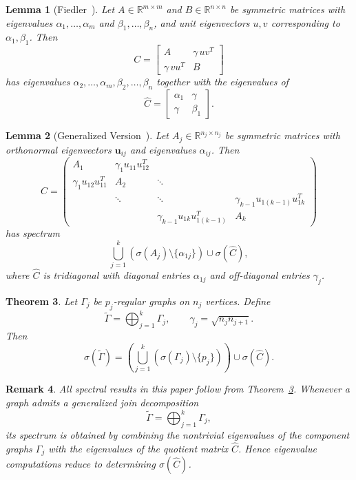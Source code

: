 \documentclass[11pt]{amsart}
\newtheorem{thm}{\bf Theorem}[section]
\newtheorem{lem}[thm]{\bf Lemma}
\newtheorem{rem}[thm]{\bf Remark}
\begin{document}
\begin{lem}[Fiedler~\cite{Fiedler1974}]
Let $A\in\mathbb{R}^{m\times m}$ and $B\in\mathbb{R}^{n\times n}$ be symmetric matrices with eigenvalues $\alpha_1,\ldots,\alpha_m$ and $\beta_1,\ldots,\beta_n$, and unit eigenvectors $u,v$ corresponding to $\alpha_1,\beta_1$. Then
\[
C=
\begin{bmatrix}
A & \gamma\,uv^T\\
\gamma\,vu^T & B
\end{bmatrix}
\]
has eigenvalues $\alpha_2,\ldots,\alpha_m, \beta_2,\ldots,\beta_n$ together with the eigenvalues of
\[
\widehat C=
\begin{bmatrix}
\alpha_1 & \gamma\\
\gamma & \beta_1
\end{bmatrix}.
\]
\end{lem}

\begin{lem}[Generalized Version~\cite{Cardoso2011}]
Let $A_j\in\mathbb{R}^{n_j\times n_j}$ be symmetric matrices with orthonormal eigenvectors $\mathbf u_{ij}$ and eigenvalues $\alpha_{ij}$. Then
\[
C=
\begin{pmatrix}
A_1 & \gamma_1u_{11}u_{12}^T & &\\
\gamma_1u_{12}u_{11}^T & A_2 & \ddots &\\
& \ddots & \ddots & \gamma_{k-1}u_{1(k-1)}u_{1k}^T\\
& & \gamma_{k-1}u_{1k}u_{1(k-1)}^T & A_k
\end{pmatrix}
\]
has spectrum
\[
\bigcup_{j=1}^k
\left(\sigma(A_j)\setminus\{\alpha_{1j}\}\right)
\cup
\sigma(\widehat C),
\]
where $\widehat C$ is tridiagonal with diagonal entries
$\alpha_{1j}$ and off-diagonal entries $\gamma_j$.
\end{lem}

\begin{thm}{\cite{Cardoso2011}}\label{1.1}
Let $\Gamma_j$ be $p_j$-regular graphs on $n_j$ vertices. Define
\[
\widetilde{\Gamma}
=\bigoplus_{j=1}^{k}\Gamma_j,
\qquad
\gamma_j=\sqrt{n_jn_{j+1}}.
\]
Then
\[
\sigma(\widetilde{\Gamma})
=
\left(
\bigcup_{j=1}^{k}
(\sigma(\Gamma_j)\setminus\{p_j\})
\right)
\cup
\sigma(\widehat C).
\]
\end{thm}

\begin{rem}\label{rem:method}
All spectral results in this paper follow from Theorem~\ref{1.1}. Whenever a graph admits a generalized join decomposition
\[
\widetilde{\Gamma}=\bigoplus_{j=1}^{k}\Gamma_j,
\]
its spectrum is obtained by combining the nontrivial eigenvalues of the component graphs $\Gamma_j$ with the eigenvalues of the quotient matrix $\widehat C$. Hence eigenvalue computations reduce to determining $\sigma(\widehat C)$.
\end{rem}
\end{document}
